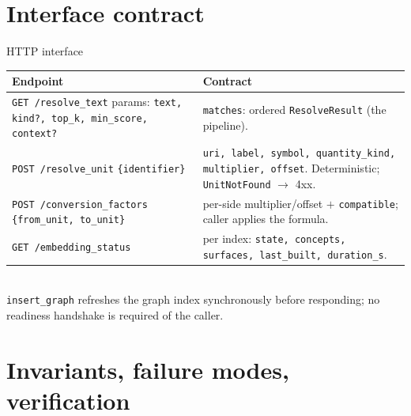 \documentclass[aspectratio=169]{beamer}
\newcommand{\code}[1]{\texttt{\small #1}}
\begin{document}
\section{Interface contract}

\begin{frame}[fragile]{HTTP interface}
  \scriptsize
  \begin{tabular}{@{}p{}p{}@{}}
    \hline
    \textbf{Endpoint} & \textbf{Contract} \\ \hline
    \code{GET /resolve\_text}\newline
      params: \code{text, kind?, top\_k, min\_score, context?} &
      \code{matches}: ordered \code{ResolveResult} (the pipeline). \\[4pt]
    \code{POST /resolve\_unit}\newline
      \code{\{identifier\}} &
      \code{uri, label, symbol, quantity\_kind, multiplier, offset}.
      Deterministic; \code{UnitNotFound} $\rightarrow$ 4xx. \\[4pt]
    \code{POST /conversion\_factors}\newline
      \code{\{from\_unit, to\_unit\}} &
      per-side multiplier/offset $+$ \code{compatible}; caller applies
      the formula. \\[4pt]
    \code{GET /embedding\_status} &
      per index: \code{state, concepts, surfaces, last\_built,
      duration\_s}. \\ \hline
  \end{tabular}
  \vspace{3pt}\\
  \code{insert\_graph} refreshes the graph index synchronously before
  responding; no readiness handshake is required of the caller.
\end{frame}

\section{Invariants, failure modes, verification}
\end{document}
